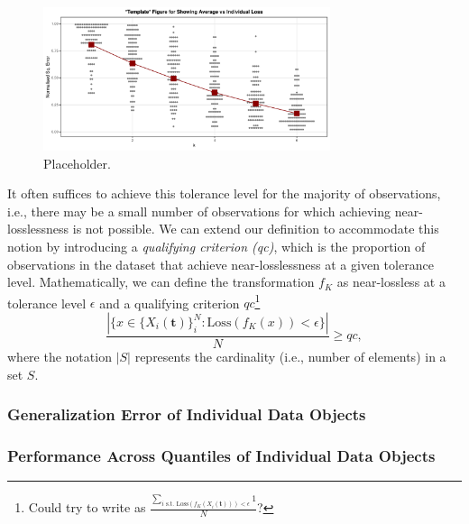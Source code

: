 {\begin{figure}
    \centering
    \includegraphics[width=0.75\textwidth]{figures/template-figure-glare.pdf}
    \caption{Placeholder.}
    \label{fig:ind-losses}
\end{figure}
\newline
It often suffices to achieve this tolerance level for the majority of observations, i.e., there may be a small number of observations for which achieving near-losslessness is not possible. We can extend our definition to accommodate this notion by introducing a \emph{qualifying criterion (qc)}, which is the proportion of observations in the dataset that achieve near-losslessness at a given tolerance level.
Mathematically, we can define the transformation $f_K$ as near-lossless at a tolerance level $\epsilon$ and a qualifying criterion $qc$\footnote{Could try to write as $\frac{\sum_{i \text{ s.t. } \text{Loss} \left( f_K(X_i(\mathbf{t})) \right) < \epsilon }1}{N}$?}
$$
\frac{| \{x \in \{X_i(\mathbf{t})\}_{i}^N : \text{Loss} \left( f_K(x) \right) < \epsilon \} |} 
{N}
\geq qc,
$$
where the notation $|S|$ represents the cardinality (i.e., number of elements) in a set $S$.}
\subsubsection{Generalization Error of Individual Data Objects}
\subsubsection{Performance Across Quantiles of Individual Data Objects}